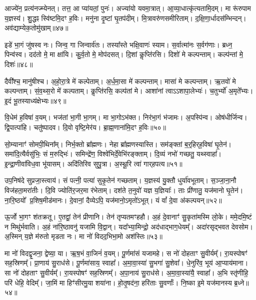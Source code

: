 आज्ये॑न॒ प्रत्य॑नज्म्येनत्।
तत्त॒ आ प्या॑यतां॒ पुनः॑।
अज्या॑यो यवमा॒त्रात्।
आ॒व्या॒धात्कृ॑त्यतामि॒दम्।
मा रू॑रुपाम य॒ज्ञस्य॑।
शु॒द्धꣴ स्वि॑ष्टमि॒दꣳ ह॒विः।
मनु॑ना दृ॒ष्टां घृ॒तप॑दीम्।
मि॒त्रावरु॑णसमीरिताम्।
द॒क्षि॒णा॒र्धादस॑म्भिन्दन्।
अव॑द्याम्ये\-क॒तोमु॑खाम्॥४७॥

इडे॑ भा॒गं जु॑षस्व नः।
जिन्व॒ गा जिन्वार्व॑तः।
तस्या᳚स्ते भक्षि॒वाणः॑ स्याम।
स॒र्वात्मा॑नः स॒र्वग॑णाः।
ब्रध्न॒ पिन्व॑स्व।
दद॑तो मे॒ मा क्षा॑यि।
कु॒र्व॒तो मे॒ मोप॑दसत्।
दि॒शां कॢप्ति॑रसि।
दिशो॑ मे कल्पन्ताम्।
कल्प॑न्तां मे॒ दिशः॑॥४८॥

दैवी᳚श्च॒ मानु॑षीश्च।
अ॒हो॒रा॒त्रे मे॑ कल्पेताम्।
अ॒र्ध॒मा॒सा मे॑ कल्पन्ताम्।
मासा॑ मे कल्पन्ताम्।
ऋ॒तवो॑ मे कल्पन्ताम्।
सं॒व॒थ्स॒रो मे॑ कल्पताम्।
कॢप्ति॑रसि॒ कल्प॑तां मे।
आशा॑नां त्वा\-ऽऽशापा॒लेभ्यः॑।
च॒तुर्भ्यो॑ अ॒मृते᳚भ्यः।
इ॒दं भू॒तस्याध्य॑क्षेभ्यः॥४९॥

वि॒धेम॑ ह॒विषा॑ व॒यम्।
भज॑तां भा॒गी भा॒गम्।
मा भा॒गो\-ऽभ॑क्त।
निर॑भा॒गं भ॑जामः।
अ॒पस्पि॑न्व।
ओष॑धीर्जिन्व।
द्वि॒पात्पा॑हि।
चतु॑ष्पादव।
दि॒वो वृष्टि॒मेर॑य।
ब्रा॒ह्म॒णाना॑मि॒दꣳ ह॒विः॥५०॥

सो॒म्यानाꣳ॑ सोमपी॒थिना᳚म्।
निर्भ॒क्तो ब्रा᳚ह्मणः।
नेहा ब्रा᳚ह्मणस्यास्ति।
सम॑ङ्क्तां ब॒र्॒हिर्‌\mbox{}ह॒विषा॑ घृ॒तेन॑।
समा॑दि॒त्यैर्वसु॑भिः॒ सं म॒रुद्भिः॑।
समिन्द्रे॑ण॒ विश्वे॑भिर्दे॒वेभि॑रङ्क्ताम्।
दि॒व्यं नभो॑ गच्छतु॒ यथ्स्वाहा᳚।
इ॒न्द्रा॒णीवा॑विध॒वा भू॑यासम्।
अदि॑तिरिव सुपु॒त्रा।
अ॒स्थू॒रि त्वा॑ गार्‌\mbox{}हपत्य॥५१॥

उप॒निष॑दे सुप्रजा॒स्त्वाय॑।
सं पत्नी॒ पत्या॑ सुकृ॒तेन॑ गच्छताम्।
य॒ज्ञस्य॑ यु॒क्तौ धुर्या॑वभूताम्।
स॒ञ्जा॒ना॒नौ विज॑हता॒मरा॑तीः।
दि॒वि ज्योति॑र॒जर॒मा र॑भेताम्।
दश॑ते त॒नुवो॑ यज्ञ य॒ज्ञियाः᳚।
ताः प्री॑णातु॒ यज॑मानो घृ॒तेन॑।
ना॒रि॒ष्ठयो᳚ प्र॒शिष॒मीड॑मानः।
दे॒वानां॒ दैव्येऽपि॒ यज॑मानो॒\-ऽमृतो॑\-ऽभूत्।
यं वां᳚ दे॒वा अ॑कल्पयन्॥५२॥

ऊ॒र्जो भा॒गꣳ श॑तक्रतू।
ए॒तद्वां॒ तेन॑ प्रीणानि।
तेन॑ तृप्यतमꣳहहौ।
अ॒हं दे॒वानाꣳ॑ सु॒कृता॑मस्मि लो॒के।
ममे॒दमि॒ष्टं न मिथु॑र्भवाति।
अ॒हं ना॑रि॒ष्ठावनु॑ यजामि वि॒द्वान्।
यदा᳚भ्या॒मिन्द्रो॒ अद॑धाद्भाग॒धेयम्᳚।
अदा॑रसृद्भवत देवसोम।
अ॒स्मिन् य॒ज्ञे म॑रुतो मृडता नः।
मा नो॑ विदद॒भिभा॒मो अश॑स्तिः॥५३॥

मा नो॑ विदद्वृ॒जना॒ द्वेष्या॒ या।
ऋ॒ष॒भं वा॒जिनं॑ व॒यम्।
पू॒र्णमा॑सं यजामहे।
स नो॑ दोहताꣳ सु॒वीर्यम्᳚।
रा॒यस्पोषꣳ॑ सह॒स्रिणम्᳚।
प्रा॒णाय॑ सु॒राध॑से।
पू॒र्णमा॑साय॒ स्वाहा᳚।
अ॒मा॒वा॒स्या॑ सु॒भगा॑ सु॒शेवा᳚।
धे॒नुरि॑व॒ भूय॑ आ॒प्याय॑माना।
सा नो॑ दोहताꣳ सु॒वीर्यम्᳚।
रा॒यस्पोषꣳ॑ सह॒स्रिणम्᳚।
अ॒पा॒नाय॑ सु॒राध॑से।
अ॒मा॒वा॒स्या॑यै॒ स्वाहा᳚।
अ॒भि स्तृ॑णीहि॒ परि॑ धेहि॒ वेदिम्᳚।
जा॒मिं मा हिꣳ॑सीरमु॒या शया॑ना।
हो॒तृ॒षद॑ना॒ हरि॑ताः सु॒वर्णाः᳚।
नि॒ष्का इ॒मे यज॑मानस्य ब्र॒ध्ने॥५४॥

